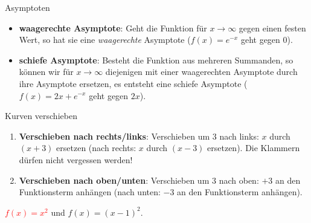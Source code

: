 \begin{bla}{Asymptoten}
  \begin{itemize}
    \item \textbf{waagerechte Asymptote}: Geht die Funktion für $x \rightarrow \infty$ gegen einen festen Wert, so hat sie eine \emph{waagerechte} Asymptote ($f(x)=e^{-x}$ geht gegen $0$).
    \item \textbf{schiefe Asymptote}: Besteht die Funktion aus mehreren Summanden, so können wir für $x \rightarrow \infty$ diejenigen mit einer waagerechten Asymptote durch ihre Asymptote ersetzen, es entsteht eine schiefe Asymptote ($f(x)=2x+e^{-x}$ geht gegen $2x$).
  \end{itemize}
\end{bla}

\begin{bla}{Kurven verschieben}
	\begin{enumerate}
    \item \textbf{Verschieben nach rechts/links}: Verschieben um $3$ nach links: $x$ durch $(x+3)$ ersetzen (nach rechts: $x$ durch $(x-3)$ ersetzen). Die Klammern dürfen nicht vergessen werden!

    \item \textbf{Verschieben nach oben/unten}: Verschieben um $3$ nach oben: $+3$ an den Funktionsterm anhängen (nach unten: $-3$ an den Funktionsterm anhängen).
  \end{enumerate}
\begin{marginfigure}
  \caption{\textcolor{red}{$f(x)=x^2$} und \textcolor{black!60!green}{$f(x)={(x-1)}^2$}.}
\end{marginfigure}


\end{bla}
